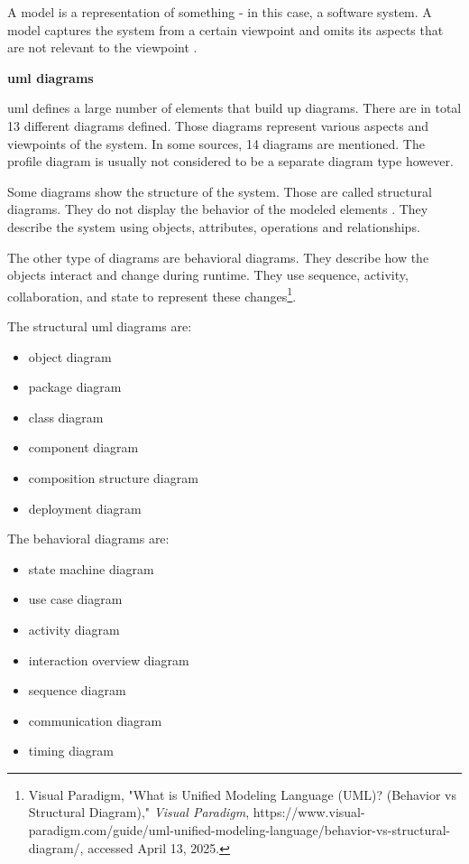 A model is a representation of something - in this case, a software system. A model captures the system from a certain viewpoint and omits its aspects that are not relevant to the viewpoint \cite{jacobson2021unified}. %


\textbf{\ac{uml} diagrams}

\ac{uml} defines a large number of elements that build up diagrams. There are in total 13 different diagrams defined. Those diagrams represent various aspects and viewpoints of the system. In some sources, 14 diagrams are mentioned. The profile diagram is usually not considered to be a separate diagram type however.

Some diagrams show the structure of the system. Those are called structural diagrams. They do not display the behavior of the modeled elements \cite{seidl2015uml}. They describe the system using objects, attributes, operations and relationships. %

The other type of diagrams are behavioral diagrams. They describe how the objects interact and change during runtime. They use sequence, activity, collaboration, and state to represent these changes\footnote{Visual Paradigm, "What is Unified Modeling Language (UML)? (Behavior vs Structural Diagram)," \textit{Visual Paradigm}, https://www.visual-paradigm.com/guide/uml-unified-modeling-language/behavior-vs-structural-diagram/, accessed April 13, 2025.}.

The structural \ac{uml} diagrams are:

\begin{itemize}
    \item object diagram
    \item package diagram
    \item class diagram
    \item component diagram
    \item composition structure diagram
    \item deployment diagram
\end{itemize}

The behavioral diagrams are:

\begin{itemize}
    \item state machine diagram
    \item use case diagram
    \item activity diagram
    \item interaction overview diagram
    \item sequence diagram
    \item communication diagram
    \item timing diagram
\end{itemize}

